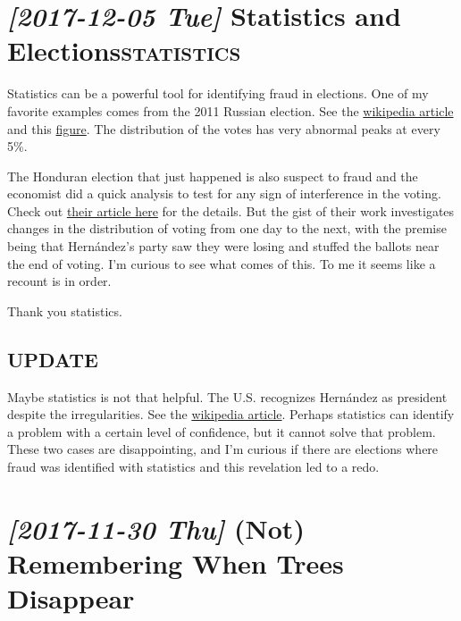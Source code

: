 \documentclass{article}
\begin{document}
\section*{\textit{[2017-12-05 Tue] } Statistics and Elections\hfill{}\textsc{statistics}}
\label{sec:org6d22793}
Statistics can be a powerful tool for identifying fraud in elections.
One of my favorite examples comes from the 2011 Russian election.  See
the \href{https://en.wikipedia.org/wiki/Russian\_legislative\_election,\_2011\#Statistics}{wikipedia article} and this \href{https://en.wikipedia.org/wiki/Russian\_legislative\_election,\_2011\#/media/File:2011\_Duma\_votes.svg}{figure}.  The distribution of the votes
has very abnormal peaks at every 5\%.

The Honduran election that just happened is also suspect to fraud and
the economist did a quick analysis to test for any sign of interference
in the voting.  Check out \href{https://www.economist.com/news/americas/21731972-questions-about-integrity-vote-count-will-not-go-away-analysing-juan-orlando}{their article here} for the details.  But
the gist of their work investigates changes in the distribution of
voting from one day to the next, with the premise being that
Hernández's party saw they were losing and stuffed the ballots near
the end of voting.  I'm curious to see what comes of this.  To me it
seems like a recount is in order.

Thank you statistics.

\subsection*{UPDATE}
\label{sec:orgc8634b9}
Maybe statistics is not that helpful.  The U.S. recognizes Hernández
as president despite the irregularities.  See the \href{https://en.wikipedia.org/wiki/Honduran\_general\_election,\_2017}{wikipedia article}.
Perhaps statistics can identify a problem with a certain level of
confidence, but it cannot solve that problem.  These two cases are
disappointing, and I'm curious if there are elections where fraud was
identified with statistics and this revelation led to a redo.

\section*{\textit{[2017-11-30 Thu] } (Not) Remembering When Trees Disappear}
\label{sec:org63f0716}
\end{document}
